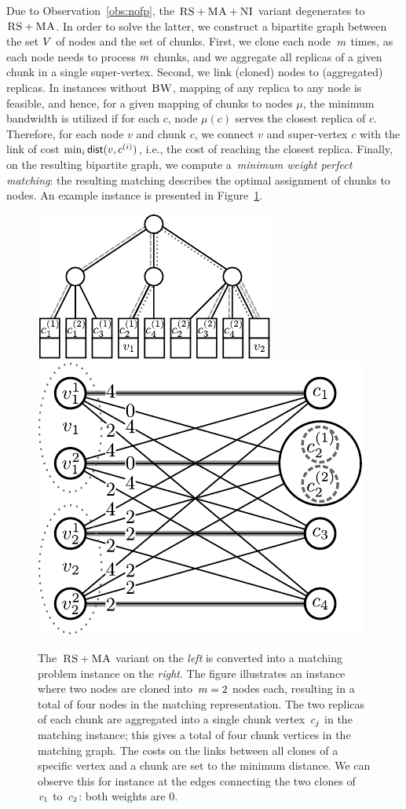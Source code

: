  Due to Observation~\ref{obs:nofp}, the $\textsc{RS}+\textsc{MA}+\textsc{NI}$ variant degenerates to~$\textsc{RS}+\textsc{MA}$.
In order to solve the latter,
we construct a bipartite
graph between the set
$V$ of nodes and
the set of chunks.
First, we clone each node~$m$ times,
as each node needs to process
$m$ chunks, and we aggregate all replicas of a given chunk in a
single %
super-vertex.
Second, we link (cloned) nodes to (aggregated) replicas.
In instances without $\textsc{BW}$, mapping of any replica to any node is feasible, and hence, for a given mapping of chunks to nodes $\mu$, the minimum bandwidth is utilized if for each $c$, node $\mu(c)$ serves the closest replica of $c$.
Therefore, for each node $v$ and chunk $c$, we connect $v$ and super-vertex $c$ with the link of cost $\min_i \mathrm{\textsf{dist}}(v,c^{(i)})$, i.e., the cost of reaching the closest replica.
Finally, on the resulting bipartite graph, we compute a~\emph{minimum weight
perfect
matching}:
the resulting matching describes the optimal assignment of chunks to nodes.
An example instance is presented in Figure~\ref{fig:matching}.


\begin{figure}
  \centering
  \includegraphics[width = 0.39\columnwidth]{figs/static-mapping/model_ma_r_cv_boxes}
  \centering
  \hspace{1cm}
  \includegraphics[width =0.39\columnwidth]{figs/static-mapping/matching}
\caption{The~$\textsc{RS}+\textsc{MA}$ variant on the \emph{left} is converted into a
  matching problem instance on the \emph{right}.
The figure illustrates
an instance where two nodes are
cloned into~$m = 2$ nodes each,
resulting in a total of four nodes in
the matching representation.
The two replicas of each chunk are
aggregated into a single chunk vertex~$c_j$  in the matching instance;
this gives a total of four chunk vertices in the matching graph. The costs
on the links between all clones of a specific vertex and a chunk are set to
the minimum distance. We can observe this for instance at the edges connecting
the two clones of~$v_1$ to~$c_2$: both weights are 0.
}
\label{fig:matching}
\end{figure}

